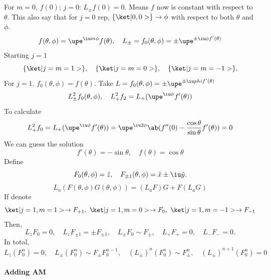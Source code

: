 For $m = 0$, $f(0)$;
$j = 0$: $L_\pm f(0) = 0$.
Means $f$ now is constant with respect to $\theta$.
This also say that for $j = 0$ rep, $\{\ket|0, 0>\} \to \phi$ with respect to both $\theta$ and $\phi$.
\[
  f(\theta,\phi) = \upe^{\iu m\phi} f(\theta), \quad
  L_\pm = f_0(\theta, \phi) = \pm\upe^{\pm\iu\phi f'(\theta)}
\]
Starting $j = 1$
\[
  \{\ket|j = m = 1>\},\quad
  \{\ket|j = m = 0>\},\quad
  \{\ket|j = m = -1>\},
\]
For $j = 1$, $f_0(\theta,\phi) = f(\theta)$.
Take $L = f_0(\theta,\phi) = \pm\upe^{\pm\iu\\phi f'(\theta)}$
\[
  L_\pm^2 f_0(\theta, \phi), \quad
  L_+^2f_2 = L_+(\upe^{\iu\phi} f'(\theta))
\]
To calculate
\[
  L_+^2f_0
= L_+(\upe^{\iu\phi} f'(\theta))
= \upe^{\iu2\phi}\ab(f''(0) - \frac{\cos\theta}{\sin\theta}f'(\theta)) = 0
\]
We can guess the solution
\[
  f'(\theta) = -\sin\theta, \quad f(\theta) = \cos\theta
\]
Define
\[
  F_0(\theta, \phi) = \tilde z, \quad
  F_{\pm1}(\theta, \phi) = \tilde x \pm \iu \tilde y.
\]
\[
  L_a(F(\theta,\phi) G(\theta,\phi))
= (L_aF)G + F(L_aG)
\]
If denote
\[
  \ket|j=1,m=1> \to F_{+1},\
  \ket|j=1,m=0> \to F_{0},\
  \ket|j=1,m=-1> \to F_{-1}
\]
Then,
\[
  L_zF_0 = 0, \quad
  L_z F_{\pm1} = \pm F_{\pm1}, \quad
  L_\pm F_0 \sim F_\pm, \quad
  L_+ F_+ = 0, \quad
  L_- F_- = 0.
\]
In total,
\[
  L_z(F_0^n) = 0, \quad
  L_\pm(F_0^n) \sim F_\pm F_0^{n-1}, \quad
  (L_\pm)^n (F_0^n) \sim F_\pm^n, \quad
  (L_\pm)^{n+1}(F_0^n) = 0
\]

\paragraph{Adding AM}

